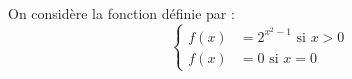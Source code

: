 \documentclass[a4paper,12pt]{report}
\begin{document}
On considère la fonction définie par :
\[\begin{cases}
f(x) &= 2^{x^2-1} \text{ si } x>0\\
f(x) &= 0 \text{ si } x=0
\end{cases}\]
\end{document}

